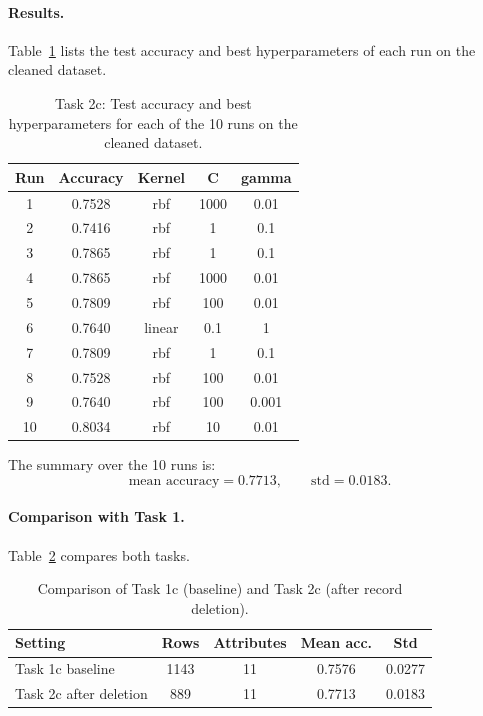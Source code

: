 \paragraph{Results.}
Table~\ref{tab:task2c} lists the test accuracy and best hyperparameters
of each run on the cleaned dataset.

\begin{table}[h]
\centering
\begin{tabular}{|c|c|c|c|c|}
\hline
\textbf{Run} & \textbf{Accuracy} & \textbf{Kernel} & \textbf{C} & \textbf{gamma} \\
\hline
 1 & 0.7528 & rbf    & 1000  & 0.01  \\ \hline
 2 & 0.7416 & rbf    & 1     & 0.1   \\ \hline
 3 & 0.7865 & rbf    & 1     & 0.1   \\ \hline
 4 & 0.7865 & rbf    & 1000  & 0.01  \\ \hline
 5 & 0.7809 & rbf    & 100   & 0.01  \\ \hline
 6 & 0.7640 & linear & 0.1   & 1     \\ \hline
 7 & 0.7809 & rbf    & 1     & 0.1   \\ \hline
 8 & 0.7528 & rbf    & 100   & 0.01  \\ \hline
 9 & 0.7640 & rbf    & 100   & 0.001 \\ \hline
10 & 0.8034 & rbf    & 10    & 0.01  \\ \hline
\end{tabular}
\caption{Task 2c: Test accuracy and best hyperparameters for each of
the 10 runs on the cleaned dataset.}
\label{tab:task2c}
\end{table}

The summary over the 10 runs is:
\[
    \text{mean accuracy} = 0.7713, \qquad
    \text{std} = 0.0183.
\]

\paragraph{Comparison with Task 1.}
Table~\ref{tab:task1_vs_task2} compares both tasks.

\begin{table}[h]
\centering
\begin{tabular}{|l|c|c|c|c|}
\hline
\textbf{Setting} & \textbf{Rows} & \textbf{Attributes} & \textbf{Mean acc.} & \textbf{Std} \\
\hline
Task 1c baseline               & 1143 & 11 & 0.7576 & 0.0277 \\ \hline
Task 2c after deletion         &  889 & 11 & 0.7713 & 0.0183 \\ \hline
\end{tabular}
\caption{Comparison of Task 1c (baseline) and Task 2c (after record
deletion).}
\label{tab:task1_vs_task2}
\end{table}

